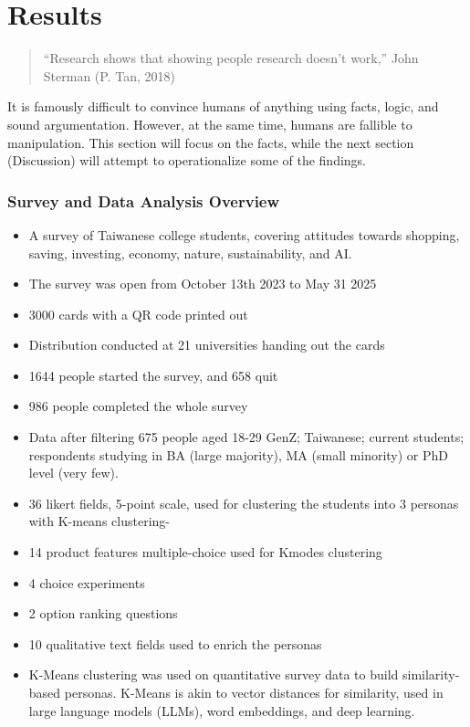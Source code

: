 \documentclass[
  12pt,
  letterpaper,
  DIV=11,
  numbers=noendperiod]{scrartcl}
\providecommand{\tightlist}{%
  \setlength{\itemsep}{0pt}\setlength{\parskip}{0pt}}
\begin{document}
\newpage

\section{Results}\label{results}

\begin{quote}
``Research shows that showing people research doesn't work,'' John
Sterman (P. Tan, 2018)
\end{quote}

It is famously difficult to convince humans of anything using facts,
logic, and sound argumentation. However, at the same time, humans are
fallible to manipulation. This section will focus on the facts, while
the next section (Discussion) will attempt to operationalize some of the
findings.

\subsubsection{Survey and Data Analysis
Overview}\label{survey-and-data-analysis-overview}

\begin{itemize}
\tightlist
\item
  A survey of Taiwanese college students, covering attitudes towards
  shopping, saving, investing, economy, nature, sustainability, and AI.
\item
  The survey was open from October 13th 2023 to May 31 2025
\item
  3000 cards with a QR code printed out
\item
  Distribution conducted at 21 universities handing out the cards
\item
  1644 people started the survey, and 658 quit
\item
  986 people completed the whole survey
\item
  Data after filtering 675 people aged 18-29 GenZ; Taiwanese; current
  students; respondents studying in BA (large majority), MA (small
  minority) or PhD level (very few).
\item
  36 likert fields, 5-point scale, used for clustering the students into
  3 personas with K-means clustering-
\item
  14 product features multiple-choice used for Kmodes clustering
\item
  4 choice experiments
\item
  2 option ranking questions
\item
  10 qualitative text fields used to enrich the personas
\item
  K-Means clustering was used on quantitative survey data to build
  similarity-based personas. K-Means is akin to vector distances for
  similarity, used in large language models (LLMs), word embeddings, and
  deep learning.
\end{itemize}
\end{document}
